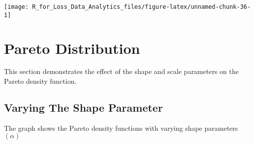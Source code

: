 \documentclass[]{book}
\theoremstyle{definition}
\theoremstyle{definition}
\theoremstyle{definition}
\theoremstyle{remark}
\begin{document}
\begin{center}\texttt{[image: R\_for\_Loss\_Data\_Analytics\_files/figure-latex/unnamed-chunk-36-1]} \end{center}

\section{Pareto Distribution}\label{pareto-distribution}

This section demonstrates the effect of the shape and scale parameters
on the Pareto density function.

\subsection{Varying The Shape
Parameter}\label{varying-the-shape-parameter-1}

The graph shows the Pareto density functions with varying shape
parameters \((\alpha)\)
\end{document}
